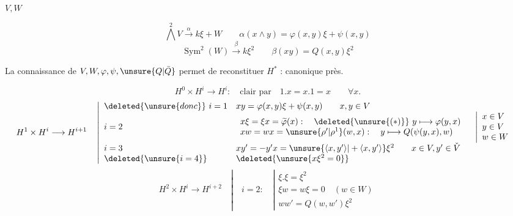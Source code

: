\begin{flushright}\end{flushright}

$V,W$

\[
\bigwedge^2 V\xrightarrow{\alpha}k\xi+W
\qquad \alpha(x\wedge y)=\varphi(x,y)\xi+\psi(x,y)
\]
\[
\operatorname{Sym}^2(W)\xrightarrow{\beta}k\xi^2
\qquad \beta(xy)=Q(x,y)\xi^2
\]

La connaissance de $V,W,\varphi,\psi,\unsure{Q|\bar Q}$ permet de reconstituer $H^*$ :
 canonique près.

\[
H^0\times H^i\longrightarrow H^i:\quad\text{clair par}\quad
1.x=x.1=x\qquad\forall x.
\]
\[
H^1\times H^i\longrightarrow H^{i+1}\quad
\left|\begin{array}{ll}
\deleted{\unsure{donc}}\ i=1&xy=\varphi(x,y)\xi+\psi(x,y)\qquad x,y\in V\\
i=2&\begin{array}{l}
x\xi=\xi x=\widetilde\varphi(x):\quad\deleted{\unsure{(*)}}\ y\longmapsto\varphi(y,x)\\
xw=wx=\unsure{\rho'|\rho^1}(w,x):\quad y\longmapsto Q(\psi(y,x),w)
\end{array}\quad\left|\begin{array}{l}x\in V\\y\in V\\w\in W\end{array}\right.\\
i=3&xy'=-y'x=\unsure{\langle x,y'\rangle|+\langle x,y'\rangle}\xi^2\qquad x\in V,y'\in\check V\\
\deleted{\unsure{i=4}}&\deleted{\unsure{x\xi^2=0}}
\end{array}\right.
\]
\[
H^2\times H^i\longrightarrow H^{i+2}\quad
\left|\quad i=2:\quad\left|\begin{array}{l}
\xi.\xi=\xi^2\\
\xi w=w\xi=0\quad(w\in W)\\
ww'=Q(w,w')\xi^2
\end{array}\right.\right.
\]

